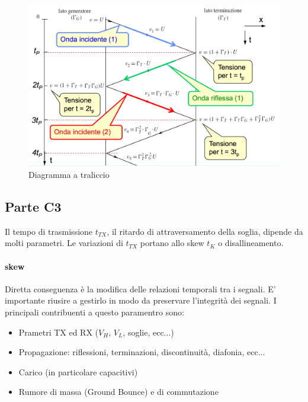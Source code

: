 \documentclass[12pt]{article}
\begin{document}
\begin{figure}[!hp]
  \includegraphics[width=\textwidth]{images/tralicc.png}
  \caption{Diagramma a traliccio}
  \label{fig:tralicc}
\end{figure}

\subsection{Parte C3}\label{c3} %
Il tempo di trasmissione $t_{TX}$, il ritardo di attraversamento della soglia, dipende da molti parametri. Le variazioni di $t_{TX}$ portano allo skew $t_{K}$ o disallineamento.

\paragraph{skew}
Diretta conseguenza è la modifica delle relazioni temporali tra i segnali. E' importante riusire a gestirlo in modo da preservare l'integrità dei segnali. I principali contribuenti a questo paramentro sono:
\begin{itemize}
  \item Prametri TX ed RX ($V_{H}$, $V_{L}$, soglie, ecc...)
  \item Propagazione: riflessioni, terminazioni, discontinuità, diafonia, ecc...
  \item Carico (in particolare capacitivi)
  \item Rumore di massa (Ground Bounce) e di commutazione
\end{itemize} %
\end{document}
